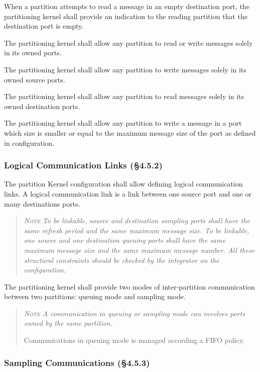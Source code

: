 When a partition attempts to read a message in an empty destination port, the partitioning kernel shall provide an indication to the reading partition that the destination port is empty.

The partitioning kernel shall allow any partition to read or write messages solely in its owned ports.

The partitioning kernel shall allow any partition to write messages solely in its owned source ports.

The partitioning kernel shall allow any partition to read messages solely in its owned destination ports.

The partitioning kernel shall allow any partition to write a message in a port which size is smaller or equal to the maximum message size of the port as defined in configuration.

\subsubsection{Logical Communication Links (\S4.5.2)}

The partition Kernel configuration shall allow defining logical communication links. A logical communication link is a link between one source port and one or many destinations ports.
\begin{quote}\it
\textsc{Note}
To be linkable, source and destination sampling ports shall have the same refresh period and the same maximum message size.  To be linkable, one source and one destination queuing ports shall have the same maximum message size and the same maximum message number. All these structural constraints should be checked by the integrator on the configuration.
\end{quote}

The partitioning kernel shall provide two modes of inter-partition communication between two partitions:  queuing mode and sampling mode.
\begin{quote}\it
\textsc{Note}
A communication in queuing or sampling mode can involves ports owned by the same partition.

Communications in queuing mode is managed according a FIFO policy.
\end{quote}

\subsubsection{Sampling Communications (\S4.5.3)}

